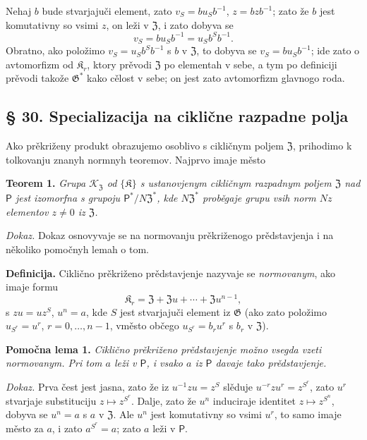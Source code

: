 \documentclass[11pt]{article}
\begin{document}
Nehaj \(b\) bude stvarjajuči element, zato \(v_S=bu_Sb^{-1}\), \(z=bzb^{-1}\); zato že \(b\) jest komutativny so vsimi \(z\), on leži v \(\mathfrak Z\), i zato dobyva se
\[
v_S=bu_Sb^{-1}=u_Sb^Sb^{-1}.
\]
Obratno, ako položimo \(v_S=u_Sb^Sb^{-1}\) s \(b\) v \(\mathfrak Z\), to dobyva se \(v_S=bu_Sb^{-1}\); ide zato o avtomorfizm od \(\mathfrak K_r\), ktory prěvodi \(\mathfrak Z\) po elementah v sebe, a tym po definiciji prěvodi takože \(\mathfrak G^*\) kako cělost v sebe; on jest zato avtomorfizm glavnogo roda.

\subsection*{§ 30. Specializacija na ciklične razpadne polja}\label{spezialisierung-auf-zyklische-zerfaellungskoerper}

Ako prěkriženy produkt obrazujemo osoblivo s cikličnym poljem \(\mathfrak Z\), prihodimo k tolkovanju znanyh normnyh teoremov. Najprvo imaje město

\noindent\textbf{Teorem 1.} \emph{Grupa \(\mathscr K_{\mathfrak Z}\) od \(\{\mathfrak K\}\) s ustanovjenym cikličnym razpadnym poljem \(\mathfrak Z\) nad \(\mathsf{P}\) jest izomorfna s grupoju \(\mathsf{P}^*/N\mathfrak Z^*\), kde \(N\mathfrak Z^*\) proběgaje grupu vsih norm \(Nz\) elementov \(z\neq0\) iz \(\mathfrak Z\).}

\noindent\emph{Dokaz.} Dokaz osnovyvaje se na normovanju prěkriženogo prědstavjenja i na několiko pomočnyh lemah o tom.

\noindent\textbf{Definicija.} Ciklično prěkriženo prědstavjenje nazyvaje se \emph{normovanym}, ako imaje formu
\[
\mathfrak K_r=\mathfrak Z+\mathfrak Zu+\cdots+\mathfrak Zu^{n-1},
\]
s \(zu=uz^S\), \(u^n=a\), kde \(S\) jest stvarjajuči element iz \(\mathfrak G\) (ako zato položimo \(u_{S^r}=u^r\), \(r=0,\ldots,n-1\), vměsto občego \(u_{S^r}=b_ru^r\) s \(b_r\) v \(\mathfrak Z\)).

\noindent\textbf{Pomočna lema 1.} \emph{Ciklično prěkriženo prědstavjenje možno vsegda vzeti normovanym. Pri tom \(a\) leži v \(\mathsf{P}\), i vsako \(a\) iz \(\mathsf{P}\) davaje tako prědstavjenje.}

\noindent\emph{Dokaz.} Prva čest jest jasna, zato že iz \(u^{-1}zu=z^S\) slěduje \(u^{-r}zu^r=z^{S^r}\), zato \(u^r\) stvarjaje substituciju \(z\mapsto z^{S^r}\). Dalje, zato že \(u^n\) induciraje identitet \(z\mapsto z^{S^n}\), dobyva se \(u^n=a\) s \(a\) v \(\mathfrak Z\). Ale \(u^n\) jest komutativny so vsimi \(u^r\), to samo imaje město za \(a\), i zato \(a^{S^r}=a\); zato \(a\) leži v \(\mathsf{P}\).
\end{document}
